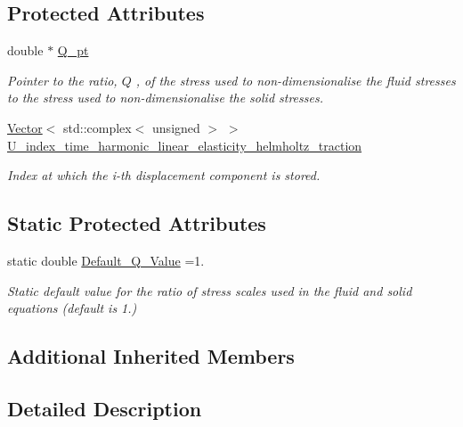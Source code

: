 \subsection*{Protected Attributes}
\begin{DoxyCompactItemize}
\item 
double $\ast$ \hyperlink{classoomph_1_1TimeHarmonicLinElastLoadedByHelmholtzPressureBCElement_ae5d333e308981db0bd733cbaa139a538}{Q\+\_\+pt}
\begin{DoxyCompactList}\small\item\em Pointer to the ratio, $ Q $ , of the stress used to non-\/dimensionalise the fluid stresses to the stress used to non-\/dimensionalise the solid stresses. \end{DoxyCompactList}\item 
\hyperlink{classoomph_1_1Vector}{Vector}$<$ std\+::complex$<$ unsigned $>$ $>$ \hyperlink{classoomph_1_1TimeHarmonicLinElastLoadedByHelmholtzPressureBCElement_a65d16036ca5c85f6cf501a992f6e85df}{U\+\_\+index\+\_\+time\+\_\+harmonic\+\_\+linear\+\_\+elasticity\+\_\+helmholtz\+\_\+traction}
\begin{DoxyCompactList}\small\item\em Index at which the i-\/th displacement component is stored. \end{DoxyCompactList}\end{DoxyCompactItemize}
\subsection*{Static Protected Attributes}
\begin{DoxyCompactItemize}
\item 
static double \hyperlink{classoomph_1_1TimeHarmonicLinElastLoadedByHelmholtzPressureBCElement_a71a4d2fe30c7423a08c883843fec938b}{Default\+\_\+\+Q\+\_\+\+Value} =1.
\begin{DoxyCompactList}\small\item\em Static default value for the ratio of stress scales used in the fluid and solid equations (default is 1.) \end{DoxyCompactList}\end{DoxyCompactItemize}
\subsection*{Additional Inherited Members}


\subsection{Detailed Description}
